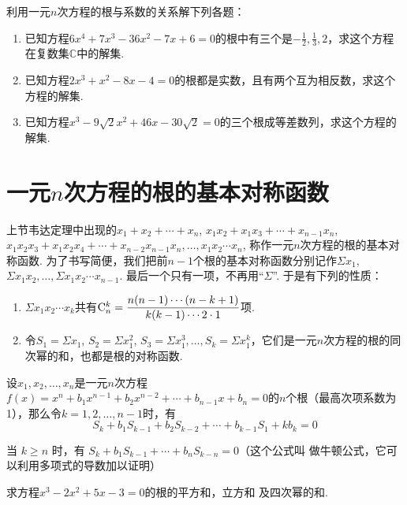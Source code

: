 \begin{ex}
利用一元$n$次方程的根与系数的关系解下列各题：
\begin{enumerate}
\item 已知方程$6x^4+7x^3-36x^2-7x+6=0$的根中有三个是$-\frac{1}{2},\frac{1}{3},2$，求这个方程在复数集$\mathbb{C}$中的解集.
\item 已知方程$2x^3+x^2-8x-4=0$的根都是实数，且有两个互为相反数，求这个方程的解集.
\item 已知方程$x^3-9\sqrt{2}x^2+46x-30\sqrt{2}=0$的三个根成等差数列，求这个方程的解集.
\end{enumerate}
\end{ex}

\section{一元$n$次方程的根的基本对称函数}

上节韦达定理中出现的$x_1+x_2+\cdots +x_n$, $x_1x_2+x_1x_3+\cdots +x_{n-1}x_n$, $x_1x_2x_3+x_1x_2x_4+\cdots +x_{n-2}x_{n-1}x_n,\ldots,x_1x_2\cdots x_n$, 称作一元$n$次方程的根的基本对称函数. 为了书写简便，我们把前$n-1$个根的基本对称函数分别记作$\Sigma x_1$,$\Sigma x_1x_2,\ldots, \Sigma x_1x_2\cdots x_{n-1}$. 最后一个只有一项，不再用“$\Sigma$”. 于是有下列的性质：

\begin{enumerate}
    \item $\Sigma x_1x_2\cdots x_k$共有${\rm C}^k_n=\frac{n(n-1)\cdots (n-k+1)}{k(k-1)\cdots 2\cdot 1}$项.
    \item 令$S_1=\Sigma x_1$, $S_2=\Sigma x^2_1$, $S_3=\Sigma x^3_1,\ldots ,S_k=\Sigma x^k_1$，它们是一元$n$次方程的根的同次幂的和，也都是根的对称函数.
\end{enumerate}


设$x_1,x_2,\ldots ,x_n$是一元$n$次方程$f(x)=x^n+b_1x^{n-1}+b_2x^{n-2}+\cdots +b_{n-1}x+b_n=0$的$n$个根（最高次项系数为1），那么令$k=1,2,\ldots ,n-1$时，有
\[S_k+b_1S_{k-1}+b_2S_{k-2}+\cdots +b_{k-1}S_1+kb_k=0\]

当 $k\geqslant n$ 时，有 $S_k+b_1S_{k-1}+\cdots+b_nS_{k-n}=0$（这个公式叫
做牛顿公式，它可以利用多项式的导数加以证明）

\begin{example}
    求方程$x^3-2x^2+5x-3=0$的根的平方和，立方和
及四次幂的和.
\end{example}

